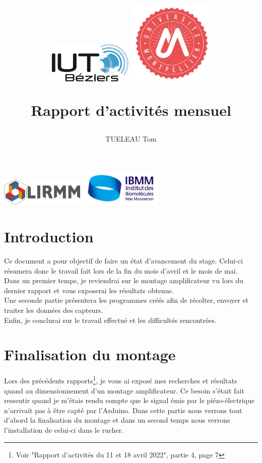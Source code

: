 \documentclass[11pt,french,a4paper]{article}
\title{
 \centering
         \includegraphics[width=4cm]{../../../logo/IUTlogo.png}  \hspace{7cm}
         \includegraphics[width=4cm]{../../../logo/UMlogo.png}  \hspace{7cm}
    
	\LARGE{Rapport d'activités mensuel}
	\author{TUELEAU Tom}
}
\author{
	\date{}
}
\begin{document}
\maketitle
	 \includegraphics[width=4cm]{../../../logo/LIRMMlogo.png}  \hspace{7cm}
         \includegraphics[width=4cm]{../../../logo/IBMMlogo.jpg}  \hspace{7cm}
\newpage
\tableofcontents
\newpage
\section{Introduction}
Ce document a pour objectif de faire un état d'avancement du stage. Celui-ci résumera donc le travail fait lors de la fin du mois d'avril et le mois de mai.
\\Dans un premier temps, je reviendrai sur le montage amplificateur vu lors du dernier rapport et vous exposerai les résultats obtenus.
\\Une seconde partie présentera les programmes créés afin de récolter, envoyer et traiter les données des capteurs. 
\\Enfin, je conclurai sur le travail effectué et les difficultés rencontrées. 

\section{Finalisation du montage}
Lors des précédents rapports\footnote{Voir "Rapport d’activités du 11 et 18 avril 2022", partie 4, page 7}, je vous ai exposé mes recherches et résultats quand au dimensionnement d'un montage amplificateur. Ce besoin s'était fait ressentir quand je m'étais rendu compte que le signal émis par le piézo-électrique n'arrivait pas à être capté par l'Arduino.  Dans cette partie nous verrons tout d'abord la finalisation du montage et dans un second temps nous verrons l'installation de celui-ci dans le rucher.\\
\end{document}
